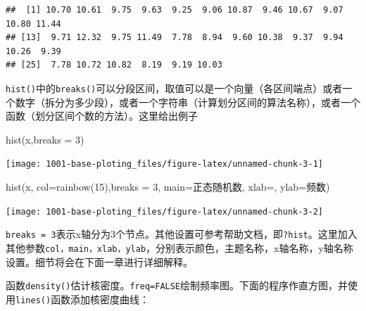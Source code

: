 \documentclass[
]{book}
\newenvironment{Shaded}{\begin{snugshade}}{\end{snugshade}}
\newcommand{\AttributeTok}[1]{\textcolor[rgb]{0.77,0.63,0.00}{#1}}
\newcommand{\DecValTok}[1]{\textcolor[rgb]{0.00,0.00,0.81}{#1}}
\newcommand{\FunctionTok}[1]{\textcolor[rgb]{0.00,0.00,0.00}{#1}}
\newcommand{\NormalTok}[1]{#1}
\newcommand{\StringTok}[1]{\textcolor[rgb]{0.31,0.60,0.02}{#1}}
\begin{document}
\begin{verbatim}
##  [1] 10.70 10.61  9.75  9.63  9.25  9.06 10.87  9.46 10.67  9.07 10.80 11.44
## [13]  9.71 12.32  9.75 11.49  7.78  8.94  9.60 10.38  9.37  9.94 10.26  9.39
## [25]  7.78 10.72 10.82  8.19  9.19 10.03
\end{verbatim}

\texttt{hist()}中的\texttt{breaks()}可以分段区间，取值可以是一个向量（各区间端点）或者一个数字（拆分为多少段），或者一个字符串（计算划分区间的算法名称），或者一个函数（划分区间个数的方法）。这里给出例子

\begin{Shaded}
\begin{Highlighting}[]
\FunctionTok{hist}\NormalTok{(x,}\AttributeTok{breaks =} \DecValTok{3}\NormalTok{)}
\end{Highlighting}
\end{Shaded}

\begin{center}\texttt{[image: 1001-base-ploting\_files/figure-latex/unnamed-chunk-3-1]} \end{center}

\begin{Shaded}
\begin{Highlighting}[]
\FunctionTok{hist}\NormalTok{(x, }\AttributeTok{col=}\FunctionTok{rainbow}\NormalTok{(}\DecValTok{15}\NormalTok{),}\AttributeTok{breaks =} \DecValTok{3}\NormalTok{,}
     \AttributeTok{main=}\StringTok{\textquotesingle{}正态随机数\textquotesingle{}}\NormalTok{, }\AttributeTok{xlab=}\StringTok{\textquotesingle{}\textquotesingle{}}\NormalTok{, }\AttributeTok{ylab=}\StringTok{\textquotesingle{}频数\textquotesingle{}}\NormalTok{)}
\end{Highlighting}
\end{Shaded}

\begin{center}\texttt{[image: 1001-base-ploting\_files/figure-latex/unnamed-chunk-3-2]} \end{center}

\texttt{breaks\ =\ 3}表示x轴分为3个节点。其他设置可参考帮助文档，即\texttt{?hist}。这里加入其他参数\texttt{col，main，xlab，ylab}，分别表示颜色，主题名称，x轴名称，y轴名称设置。细节将会在下面一章进行详细解释。

函数\texttt{density()}估计核密度。\texttt{freq=FALSE}绘制频率图。下面的程序作直方图，并使用\texttt{lines()}函数添加核密度曲线：
\end{document}

